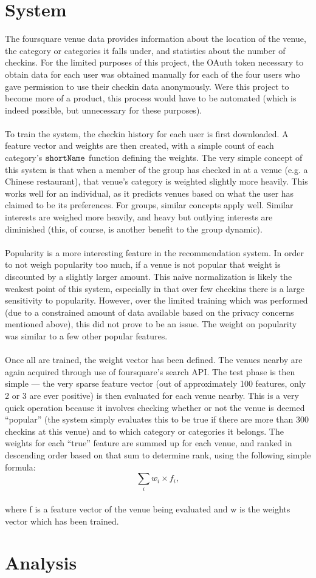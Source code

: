 \documentclass[11pt]{article}
\begin{document}
\section{System}
The foursquare venue data provides information about the location of the venue, the category or categories it falls under, and statistics
about the number of checkins. For the limited purposes of this project, the OAuth token necessary to obtain data for each user was 
obtained manually for each of the four users who gave permission to use their checkin data anonymously. Were this project to become 
more of a product, this process would have to be automated (which is indeed possible, but unnecessary for these purposes).\\ 
\\
To train the system, the checkin history for each user is first downloaded. A feature vector and weights are then created, with a simple
count of each category's $\tt{shortName}$ function defining the weights. The very simple concept of this system is that when a member
of the group has checked in at a venue (e.g. a Chinese restaurant), that venue's category is weighted slightly more heavily. This works
well for an individual, as it predicts venues based on what the user has claimed to be its preferences. For groups, similar concepts
apply well. Similar interests are weighed more heavily, and heavy but outlying interests are diminished (this, of course, is another benefit
to the group dynamic).\\
\\
Popularity is a more interesting feature in the recommendation system. In order to not weigh popularity too much, if a venue is not popular 
that weight is discounted by a slightly larger amount. This naive normalization is likely the weakest point of this system, especially 
in that over few checkins there is a large sensitivity to popularity. However, over the limited training which was performed 
(due to a constrained amount of data available based on the privacy concerns mentioned above), this did not prove to be an issue. The weight
on popularity was similar to a few other popular features.\\
\\
Once all are trained, the weight vector has been defined. The venues nearby are again acquired through use of foursquare's search API.
The test phase is then simple --- the very sparse feature vector (out of approximately 100 features, only 2 or 3 are ever positive) 
is then evaluated for each venue nearby. This is a very quick operation because it involves checking whether or not the venue is
deemed ``popular'' (the system simply evaluates this to be true if there are more than 300 checkins at this venue) and to which 
category or categories it belongs. The weights for each ``true'' feature are summed up for each venue, and ranked in descending order
based on that sum to determine rank, using the following simple formula:\\
\begin{equation}
\sum_i{w_i \times f_i},
\end{equation}
\\where f is a feature vector of the venue being evaluated and w is the weights vector which has been trained.

\section{Analysis}
\end{document}
